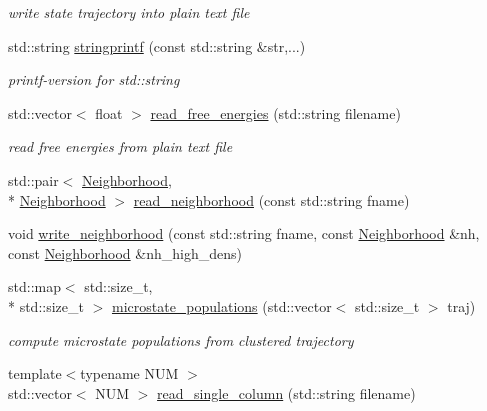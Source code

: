 \begin{DoxyCompactItemize}
\begin{DoxyCompactList}\small\item\em write state trajectory into plain text file \end{DoxyCompactList}\item 
std\-::string \hyperlink{namespaceClustering_1_1Tools_aad36a443a7ef6ac063e57642a328e73c}{stringprintf} (const std\-::string \&str,...)
\begin{DoxyCompactList}\small\item\em printf-\/version for std\-::string \end{DoxyCompactList}\item 
\hypertarget{namespaceClustering_1_1Tools_a94a5e6ebb3ae4d3b3eaf09ec4a4de955}{std\-::vector$<$ float $>$ \hyperlink{namespaceClustering_1_1Tools_a94a5e6ebb3ae4d3b3eaf09ec4a4de955}{read\-\_\-free\-\_\-energies} (std\-::string filename)}\label{namespaceClustering_1_1Tools_a94a5e6ebb3ae4d3b3eaf09ec4a4de955}

\begin{DoxyCompactList}\small\item\em read free energies from plain text file \end{DoxyCompactList}\item 
std\-::pair$<$ \hyperlink{namespaceClustering_1_1Tools_ad2b6f4886446247db27ece196d76575c}{Neighborhood}, \\*
\hyperlink{namespaceClustering_1_1Tools_ad2b6f4886446247db27ece196d76575c}{Neighborhood} $>$ \hyperlink{namespaceClustering_1_1Tools_ab10d833f766c46af0a23db54e2125ddf}{read\-\_\-neighborhood} (const std\-::string fname)
\item 
void \hyperlink{namespaceClustering_1_1Tools_a4db2b54b96ce5f68f20c31edbc72632c}{write\-\_\-neighborhood} (const std\-::string fname, const \hyperlink{namespaceClustering_1_1Tools_ad2b6f4886446247db27ece196d76575c}{Neighborhood} \&nh, const \hyperlink{namespaceClustering_1_1Tools_ad2b6f4886446247db27ece196d76575c}{Neighborhood} \&nh\-\_\-high\-\_\-dens)
\item 
\hypertarget{namespaceClustering_1_1Tools_a74a491ebb15a6a1adb058861e4d2f53f}{std\-::map$<$ std\-::size\-\_\-t, \\*
std\-::size\-\_\-t $>$ \hyperlink{namespaceClustering_1_1Tools_a74a491ebb15a6a1adb058861e4d2f53f}{microstate\-\_\-populations} (std\-::vector$<$ std\-::size\-\_\-t $>$ traj)}\label{namespaceClustering_1_1Tools_a74a491ebb15a6a1adb058861e4d2f53f}

\begin{DoxyCompactList}\small\item\em compute microstate populations from clustered trajectory \end{DoxyCompactList}\item 
\hypertarget{namespaceClustering_1_1Tools_a91d14784fa0154679137d3147a6945ef}{{\footnotesize template$<$typename N\-U\-M $>$ }\\std\-::vector$<$ N\-U\-M $>$ \hyperlink{namespaceClustering_1_1Tools_a91d14784fa0154679137d3147a6945ef}{read\-\_\-single\-\_\-column} (std\-::string filename)}\label{namespaceClustering_1_1Tools_a91d14784fa0154679137d3147a6945ef}


\end{DoxyCompactItemize}
